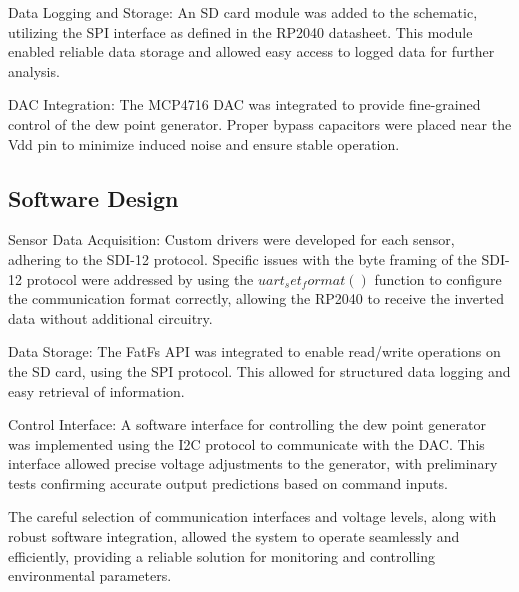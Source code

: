Data Logging and Storage: An SD card module was added to the schematic, utilizing the SPI interface as defined in the RP2040 datasheet. This module enabled reliable data storage and allowed easy access to logged data for further analysis.

DAC Integration: The MCP4716 DAC was integrated to provide fine-grained control of the dew point generator. Proper bypass capacitors were placed near the Vdd pin to minimize induced noise and ensure stable operation.


\subsection{Software Design}
Sensor Data Acquisition: Custom drivers were developed for each sensor, adhering to the SDI-12 protocol. Specific issues with the byte framing of the SDI-12 protocol were addressed by using the $uart_set_format()$ function to configure the communication format correctly, allowing the RP2040 to receive the inverted data without additional circuitry.

Data Storage: The FatFs API was integrated to enable read/write operations on the SD card, using the SPI protocol. This allowed for structured data logging and easy retrieval of information.

Control Interface: A software interface for controlling the dew point generator was implemented using the I2C protocol to communicate with the DAC. This interface allowed precise voltage adjustments to the generator, with preliminary tests confirming accurate output predictions based on command inputs.

The careful selection of communication interfaces and voltage levels, along with robust software integration, allowed the system to operate seamlessly and efficiently, providing a reliable solution for monitoring and controlling environmental parameters.